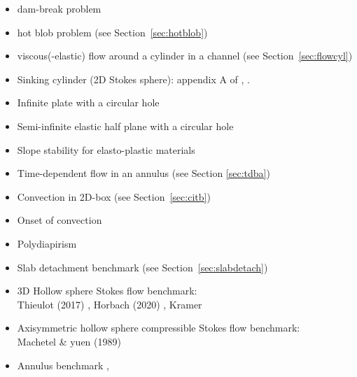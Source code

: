 \begin{itemize}
\item dam-break problem \cite{moeb99,bacp07,liir07,lemx08,homa09,anco09,grdn97,hini81,basd08}
\item hot blob problem \cite{bugs09,fumt11} (see Section~\ref{sec:hotblob})
\item viscous(-elastic) flow around a cylinder in a channel (see Section~\ref{sec:flowcyl})
\item Sinking cylinder (2D Stokes sphere): appendix A of \cite{boht08a}, \cite{wali04}.
\item Infinite plate with a circular hole \cite{yiha10,rama16}
\item Semi-infinite elastic half plane with a circular hole \cite{verr98}
\item Slope stability for elasto-plastic materials \cite{rama16}
\item Time-dependent flow in an annulus \cite{galb19} (see Section \ref{sec:tdba})
\item Convection in 2D-box \cite{galb19} (see Section~\ref{sec:citb})
\item Onset of convection \cite{aspectmanual}
\item Polydiapirism \cite{wesc92,aspectmanual}
\item Slab detachment benchmark (see Section~\ref{sec:slabdetach}) 
\item 3D Hollow sphere Stokes flow benchmark:\\
      Thieulot (2017) \cite{thie17},
      Horbach \etal (2020) \cite{homb20},
      Kramer \etal \cite{krdw21}
\item Axisymmetric hollow sphere compressible Stokes flow benchmark:\\
      Machetel \& yuen (1989) \cite{mayu89}
\item Annulus benchmark \cite{aspectmanual}, \cite{ples11}


\end{itemize}
